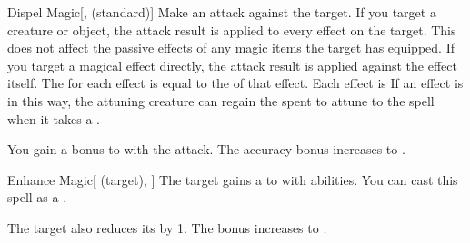 \lowercase{\hypertarget{spell:Dispel Magic}{}}\label{spell:Dispel Magic}
\begin{freeability}[Rank 3]{\hypertarget{spell:Dispel Magic}{Dispel Magic}}[,  (standard)]
Make an attack against the target.
If you target a creature or object, the attack result is applied to every  effect on the target.
This does not affect the passive effects of any magic items the target has equipped.
If you target a magical effect directly, the attack result is applied against the effect itself.
The  for each effect is equal to the  of that effect.
\hit Each effect is 
If an  effect is  in this way,
the attuning creature can regain the  spent to attune to the spell when it takes a .

\rankline
{} You gain a  bonus to  with the attack.
 The accuracy bonus increases to .
\end{freeability}
\vspace{0.25em}



\lowercase{\hypertarget{spell:Enhance Magic}{}}\label{spell:Enhance Magic}
\begin{attuneability}[Rank 3]{\hypertarget{spell:Enhance Magic}{Enhance Magic}}[ (target), ]
The target gains a   to  with  abilities.
You can cast this spell as a .

\rankline
{} The target also reduces its  by 1.
 The bonus increases to .
\end{attuneability}
\vspace{0.25em}



